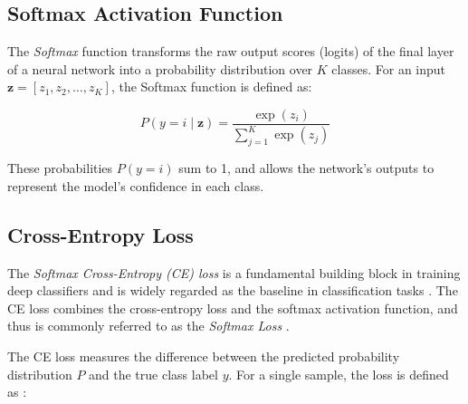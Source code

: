 



\subsection{Softmax Activation Function}
\label{sec:softmax}
The \textit{Softmax} function transforms the raw output scores (logits) of the final layer of a neural network into a probability distribution over \( K \) classes. For an input \( \mathbf{z} = [z_1, z_2, \dots, z_K] \), the Softmax function is defined as:

\begin{equation}
    \label{eq:softmax}
    P(y = i \mid \mathbf{z}) = \frac{\exp(z_i)}{\sum_{j=1}^{K} \exp(z_j)}
\end{equation}

\noindent These probabilities $P(y=i)$ sum to 1, and allows the network's outputs to represent the model's confidence in each class.

\subsection{Cross-Entropy Loss}
\label{sec:ce_loss}
The \emph{Softmax Cross-Entropy (CE) loss} is a fundamental building block in training deep classifiers and is widely regarded as the baseline in classification tasks \cite{zhang2023deep, cs231n, pytorch_crossentropy}. The CE loss combines the cross-entropy loss and the softmax activation function, and thus is commonly referred to as the \emph{Softmax Loss} \cite{zhang2023dive,Goodfellow-et-al-2016,zhang2023deep}. 

The CE loss measures the difference between the predicted probability distribution $P$ and the true class label $y$. For a single sample, the loss is defined as \cite{zhang2023dive,cs231n}:

